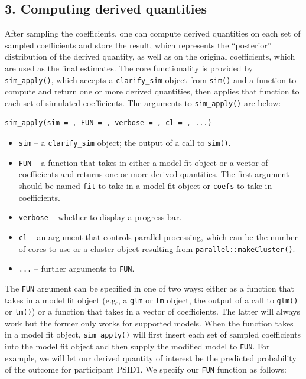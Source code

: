 \subsection{3. Computing derived quantities}\label{computing-derived-quantities}
After sampling the coefficients, one can compute derived quantities on each set of sampled coefficients and store the result, which represents the ``posterior'' distribution of the derived quantity, as well as on the original coefficients, which are used as the final estimates. The core functionality is provided by \texttt{sim\_apply()}, which accepts a \texttt{clarify\_sim} object from \texttt{sim()} and a function to compute and return one or more derived quantities, then applies that function to each set of simulated coefficients. The arguments to \texttt{sim\_apply()} are below:
\begin{verbatim}
sim_apply(sim = , FUN = , verbose = , cl = , ...)
\end{verbatim}
\begin{itemize}
\item
  \texttt{sim} -- a \texttt{clarify\_sim} object; the output of a call to \texttt{sim()}.
\item
  \texttt{FUN} -- a function that takes in either a model fit object or a vector of coefficients and returns one or more derived quantities. The first argument should be named \texttt{fit} to take in a model fit object or \texttt{coefs} to take in coefficients.
\item
  \texttt{verbose} -- whether to display a progress bar.
\item
  \texttt{cl} -- an argument that controls parallel processing, which can be the number of cores to use or a cluster object resulting from \texttt{parallel::makeCluster()}.
\item
  \texttt{...} -- further arguments to \texttt{FUN}.
\end{itemize}
The \texttt{FUN} argument can be specified in one of two ways: either as a function that takes in a model fit object (e.g., a \texttt{glm} or \texttt{lm} object, the output of a call to \texttt{glm()} or \texttt{lm()}) or a function that takes in a vector of coefficients. The latter will always work but the former only works for supported models. When the function takes in a model fit object, \texttt{sim\_apply()} will first insert each set of sampled coefficients into the model fit object and then supply the modified model to \texttt{FUN}.
For example, we will let our derived quantity of interest be the predicted probability of the outcome for participant PSID1. We specify our \texttt{FUN} function as follows:
